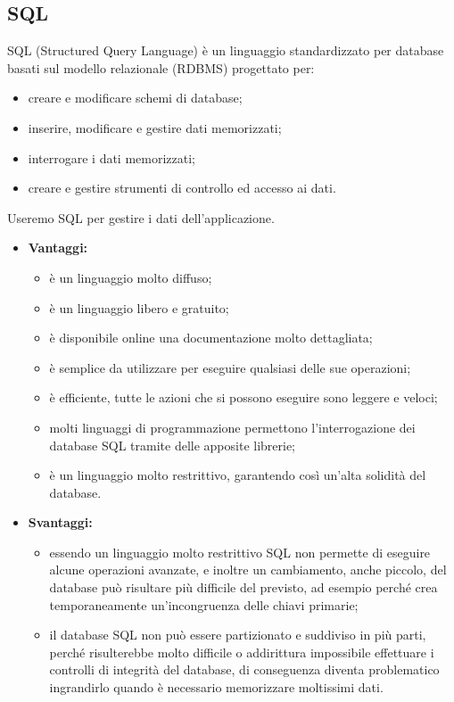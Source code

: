 \subsection{SQL}
	SQL (Structured Query Language) è un linguaggio standardizzato per database basati sul modello relazionale (RDBMS) progettato per:
	\begin{itemize}
		\item 	creare e modificare schemi di database;
		\item 	inserire, modificare e gestire dati memorizzati;
		\item 	interrogare i dati memorizzati;
		\item 	creare e gestire strumenti di controllo ed accesso ai dati.
	\end{itemize}
	Useremo SQL per gestire i dati dell'applicazione.
	
	\begin{itemize}
		\item \textbf{Vantaggi:}
			\begin{itemize}
				\item è un linguaggio molto diffuso;
				\item è un linguaggio libero e gratuito;
				\item è disponibile online una documentazione molto dettagliata;
				\item è semplice da utilizzare per eseguire qualsiasi delle sue operazioni;
				\item è efficiente, tutte le azioni che si possono eseguire sono leggere e veloci;
				\item molti linguaggi di programmazione permettono l'interrogazione dei database SQL tramite delle apposite librerie;
				\item è un linguaggio molto restrittivo, garantendo così un'alta solidità del database.
			\end{itemize}
		\item \textbf{Svantaggi:}
			\begin{itemize}
				\item essendo un linguaggio molto restrittivo SQL non permette di eseguire alcune operazioni avanzate, e inoltre un cambiamento, anche piccolo, del database può risultare più difficile del previsto, ad esempio perché crea temporaneamente un'incongruenza delle chiavi primarie;
				\item il database SQL non può essere partizionato e suddiviso in più parti, perché risulterebbe molto difficile o addirittura impossibile effettuare i controlli di integrità del database, di conseguenza diventa problematico ingrandirlo quando è necessario memorizzare moltissimi dati.
			\end{itemize}
	\end{itemize}
	
